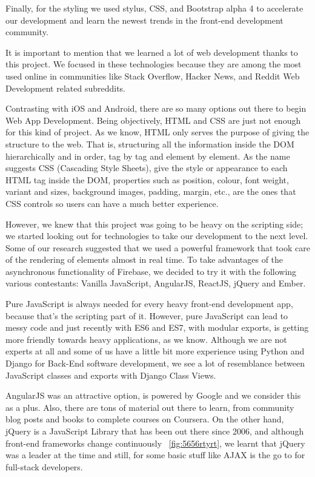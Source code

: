 Finally, for the styling we used stylus, CSS, and Bootstrap alpha 4 to accelerate our development and learn the newest trends in the front-end development community.

It is important to mention that we learned a lot of web development thanks to this project. We focused in these technologies because they are among the most used online in communities like Stack Overflow, Hacker News, and Reddit Web Development related subreddits.

Contrasting with iOS and Android, there are so many options out there to begin Web App Development. Being objectively, HTML and CSS are just not enough for this kind of project. As we know, HTML only serves the purpose of giving the structure to the web. That is, structuring all the information inside the DOM hierarchically and in order, tag by tag and element by element. As the name suggests CSS (Cascading Style Sheets), give the style or appearance to each HTML tag inside the DOM, properties such as position, colour, font weight, variant and sizes, background images, padding, margin, etc., are the ones that CSS controls so users can have a much better experience. 

However, we knew that this project was going to be heavy on the scripting side; we started looking out for technologies to take our development to the next level. Some of our research suggested that we used a powerful framework that took care of the rendering of elements almost in real time. To take advantages of the asynchronous functionality of Firebase, we decided to try it with the following various contestants: Vanilla JavaScript, AngularJS, ReactJS, jQuery and Ember.

Pure JavaScript is always needed for every heavy front-end development app, because that's the scripting part of it. However, pure JavaScript can lead to messy code and just recently with ES6 and ES7, with modular exports, is getting more friendly towards heavy applications, as we know. Although we are not experts at all and some of us have a little bit more experience using Python and Django for Back-End software development, we see a lot of resemblance between JavaScript classes and exports with Django Class Views.

AngularJS was an attractive option, is powered by Google and we consider this as a plus. Also, there are tons of material out there to learn, from community blog posts and books to complete courses on Coursera. On the other hand, jQuery is a JavaScript Library that has been out there since 2006, and although front-end frameworks change continuously  ~\ref{fig:5656rtyrt}, we learnt that jQuery was a leader at the time and still, for some basic stuff like AJAX is the go to for full-stack developers. 

